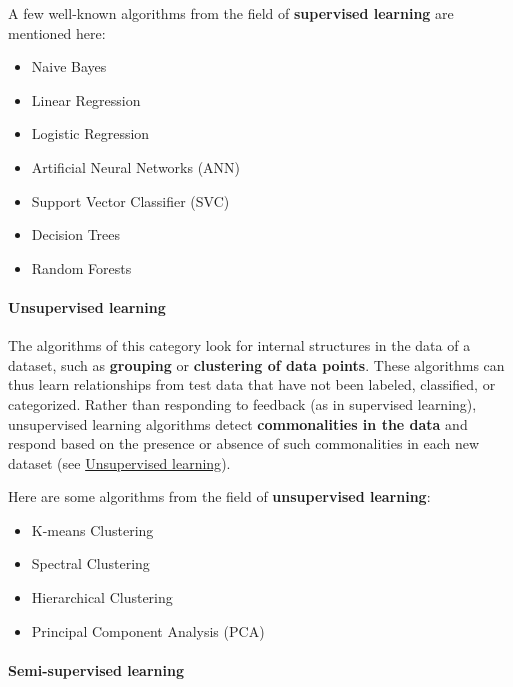\documentclass [oneside,10pt,a4paper,ngerman,BCOR10mm,headsepline,parindent,final]{scrartcl}
\providecommand{\tightlist}{%
      \setlength{\itemsep}{0pt}\setlength{\parskip}{0pt}}
\begin{document}
A few well-known algorithms from the field of \textbf{supervised
learning} are mentioned here:

\begin{itemize}
\tightlist
\item
  Naive Bayes
\item
  Linear Regression
\item
  Logistic Regression
\item
  Artificial Neural Networks (ANN)
\item
  Support Vector Classifier (SVC)
\item
  Decision Trees
\item
  Random Forests
\end{itemize}

    \hypertarget{unsupervised-learning}{%
\paragraph{Unsupervised learning}\label{unsupervised-learning}}

The algorithms of this category look for internal structures in the data
of a dataset, such as \textbf{grouping} or \textbf{clustering of data
points}. These algorithms can thus learn relationships from test data
that have not been labeled, classified, or categorized. Rather than
responding to feedback (as in supervised learning), unsupervised
learning algorithms detect \textbf{commonalities in the data} and
respond based on the presence or absence of such commonalities in each
new dataset (see
\href{https://en.wikipedia.org/wiki/Machine_learning\#Unsupervised_learning}{Unsupervised
learning}).

Here are some algorithms from the field of \textbf{unsupervised
learning}:

\begin{itemize}
\tightlist
\item
  K-means Clustering
\item
  Spectral Clustering
\item
  Hierarchical Clustering
\item
  Principal Component Analysis (PCA)
\end{itemize}

    \hypertarget{semi-supervised-learning}{%
\paragraph{Semi-supervised learning}\label{semi-supervised-learning}}
\end{document}
